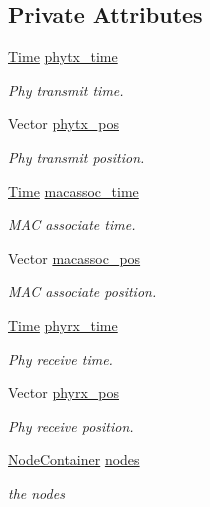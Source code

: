\subsection*{Private Attributes}
\begin{DoxyCompactItemize}
\item 
\hyperlink{classns3_1_1Time}{Time} \hyperlink{classOcbWifiMacTestCase_a0a14009e9033e7b904415e5f9bb6781f}{phytx\+\_\+time}
\begin{DoxyCompactList}\small\item\em Phy transmit time. \end{DoxyCompactList}\item 
Vector \hyperlink{classOcbWifiMacTestCase_adee26be5d4904f0454181b471577e507}{phytx\+\_\+pos}
\begin{DoxyCompactList}\small\item\em Phy transmit position. \end{DoxyCompactList}\item 
\hyperlink{classns3_1_1Time}{Time} \hyperlink{classOcbWifiMacTestCase_aa00335f700f1c4a5b9890e5de5470eb3}{macassoc\+\_\+time}
\begin{DoxyCompactList}\small\item\em M\+AC associate time. \end{DoxyCompactList}\item 
Vector \hyperlink{classOcbWifiMacTestCase_a428f0d3f034ce62204bb6977125e8b3f}{macassoc\+\_\+pos}
\begin{DoxyCompactList}\small\item\em M\+AC associate position. \end{DoxyCompactList}\item 
\hyperlink{classns3_1_1Time}{Time} \hyperlink{classOcbWifiMacTestCase_ae75f036a26277e8c7346986810ba6004}{phyrx\+\_\+time}
\begin{DoxyCompactList}\small\item\em Phy receive time. \end{DoxyCompactList}\item 
Vector \hyperlink{classOcbWifiMacTestCase_af78ec87cad327b0a471bb8c105b97ee3}{phyrx\+\_\+pos}
\begin{DoxyCompactList}\small\item\em Phy receive position. \end{DoxyCompactList}\item 
\hyperlink{classns3_1_1NodeContainer}{Node\+Container} \hyperlink{classOcbWifiMacTestCase_ae01930c670f59939ba7678a09302774f}{nodes}
\begin{DoxyCompactList}\small\item\em the nodes \end{DoxyCompactList}\end{DoxyCompactItemize}
